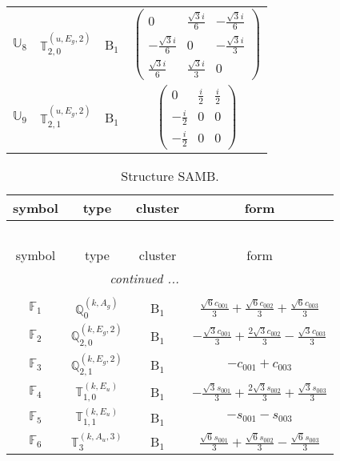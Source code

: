\documentclass[fleqn,10pt,landscape]{article}
\begin{document}
\begin{itemize}
\begin{center}
\begin{longtable}{c|c|c|c}
$ \mathbb{U}_{8} $ & $\mathbb{T}_{2,0}^{(u,E_{g},2)}$ & B$_{1}$ & $\begin{pmatrix} 0 & \frac{\sqrt{3} i}{6} & - \frac{\sqrt{3} i}{6} \\ - \frac{\sqrt{3} i}{6} & 0 & - \frac{\sqrt{3} i}{3} \\ \frac{\sqrt{3} i}{6} & \frac{\sqrt{3} i}{3} & 0 \end{pmatrix}$ \\
$ \mathbb{U}_{9} $ & $\mathbb{T}_{2,1}^{(u,E_{g},2)}$ & B$_{1}$ & $\begin{pmatrix} 0 & \frac{i}{2} & \frac{i}{2} \\ - \frac{i}{2} & 0 & 0 \\ - \frac{i}{2} & 0 & 0 \end{pmatrix}$ \\
\end{longtable}
\end{center}
\begin{center}
\renewcommand{\arraystretch}{1.3}
\begin{longtable}{c|c|c|c}
\caption{Structure SAMB.}
 \\
 \hline \hline
symbol & type & cluster & form \\ \hline \endfirsthead

\multicolumn{3}{l}{\tablename\ \thetable{}} \\
 \hline \hline
symbol & type & cluster & form \\ \hline \endhead

 \hline \hline
\multicolumn{3}{r}{\footnotesize\it continued ...} \\ \endfoot

 \hline \hline
\multicolumn{3}{r}{} \\ \endlastfoot

$ \mathbb{F}_{1} $ & $\mathbb{Q}_{0}^{(k,A_{g})}$ & B$_{1}$ & $\frac{\sqrt{6} c_{001}}{3} + \frac{\sqrt{6} c_{002}}{3} + \frac{\sqrt{6} c_{003}}{3}$ \\
$ \mathbb{F}_{2} $ & $\mathbb{Q}_{2,0}^{(k,E_{g},2)}$ & B$_{1}$ & $- \frac{\sqrt{3} c_{001}}{3} + \frac{2 \sqrt{3} c_{002}}{3} - \frac{\sqrt{3} c_{003}}{3}$ \\
$ \mathbb{F}_{3} $ & $\mathbb{Q}_{2,1}^{(k,E_{g},2)}$ & B$_{1}$ & $- c_{001} + c_{003}$ \\
$ \mathbb{F}_{4} $ & $\mathbb{T}_{1,0}^{(k,E_{u})}$ & B$_{1}$ & $- \frac{\sqrt{3} s_{001}}{3} + \frac{2 \sqrt{3} s_{002}}{3} + \frac{\sqrt{3} s_{003}}{3}$ \\
$ \mathbb{F}_{5} $ & $\mathbb{T}_{1,1}^{(k,E_{u})}$ & B$_{1}$ & $- s_{001} - s_{003}$ \\
$ \mathbb{F}_{6} $ & $\mathbb{T}_{3}^{(k,A_{u},3)}$ & B$_{1}$ & $\frac{\sqrt{6} s_{001}}{3} + \frac{\sqrt{6} s_{002}}{3} - \frac{\sqrt{6} s_{003}}{3}$ \\
\end{longtable}
\end{center}


\end{itemize}
\end{document}
